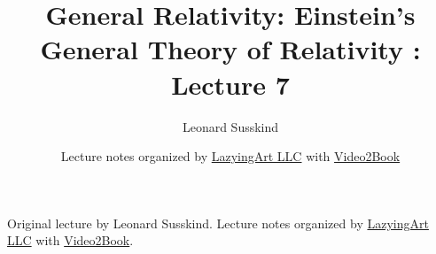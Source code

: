 \documentclass[11pt,oneside]{book}
\begin{document}
\frontmatter
\title{General Relativity: Einstein's General Theory of Relativity : Lecture 7}
\author{Leonard Susskind}
\date{Lecture notes organized by \href{https://lazying.art}{LazyingArt LLC} with \href{https://github.com/lachlanchen/Video2Book}{Video2Book}}
\maketitle
\begin{center}
\small Original lecture by Leonard Susskind. Lecture notes organized by \href{https://lazying.art}{LazyingArt LLC} with \href{https://github.com/lachlanchen/Video2Book}{Video2Book}.
\end{center}
\clearpage
\mainmatter

\end{document}
